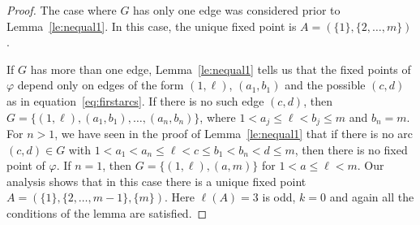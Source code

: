 \documentclass[ALCO,ThmDefs,Unicode,epreuves]{cedram}
\begin{document}
\begin{proof} 

The case where $G$ has only one edge was considered prior to Lemma~\ref{le:nequal1}. In this case, the unique fixed point is $A=(\{1\},\{2,\ldots,m\})$. 

If $G$ has more than one edge,
Lemma~\ref{le:nequal1} tells us that the fixed points of $\varphi$ depend only on edges of the form
$(1,\ell)$, $(a_1,b_1)$ and the possible $(c,d)$ as in equation~\eqref{eq:firstarcs}. If there is no such edge $(c,d)$, then 
$G=\big\{(1,\ell),(a_1,b_1),\ldots,(a_n,b_n)\big\}$, where $1<a_j\le \ell<b_j\le m$ and $b_n=m$.
For $n>1$, we have seen in the proof of Lemma~\ref{le:nequal1} that if there is no arc $(c,d)\in G$ with $ 1<a_1<a_n \le\ell <c\le b_1<b_n<d\le m$, then there is no fixed point of $\varphi$. 
If $n=1$, then $G=\big\{(1,\ell),(a,m)\big\}$ for $1<a\le \ell<m$. Our analysis shows that in this case there is a unique fixed point $A=(\{1\},\{2,\ldots,m-1\},\{m\})$. Here $\ell(A)=3$ is odd, $k=0$ and 
again all the conditions of the lemma are satisfied.


\end{proof}
\end{document}
